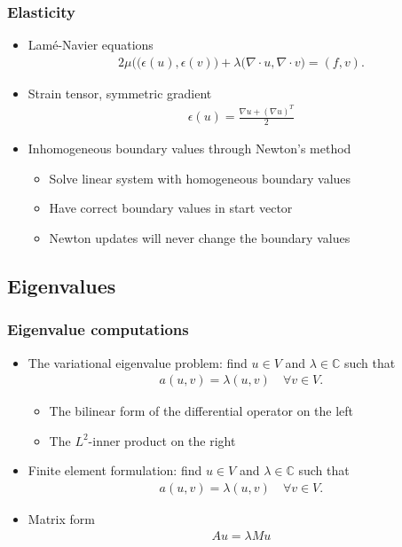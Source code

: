 \begin{frame}
  \frametitle{Elasticity}
  \begin{itemize}
  \item Lamé-Navier equations
    \begin{gather*}
      2\mu \bigl((\epsilon(u), \epsilon(v)\bigr)
      + \lambda \bigl(\nabla\!\cdot\!u,\nabla\!\cdot\!v\bigr)
      = (f,v).
    \end{gather*}
  \item Strain tensor, symmetric gradient
    \begin{gather*}
      \epsilon(u) = \frac{\nabla u + (\nabla u)^T}{2}
    \end{gather*}
  \item Inhomogeneous boundary values through Newton's method
    \begin{itemize}
    \item Solve linear system with homogeneous boundary values
    \item Have correct boundary values in start vector
    \item Newton updates will never change the boundary values
    \end{itemize}
  \end{itemize}
\end{frame}

\subsection{Eigenvalues}
\frame{\tableofcontents[currentsection,subsectionstyle=show/shaded/hide]}

\begin{frame}
  \frametitle{Eigenvalue computations}
  \begin{itemize}
  \item The variational eigenvalue problem: find $u\in V$ and $\lambda\in\mathbb C$ such that
    \begin{gather*}
      a(u,v) = \lambda (u,v)\quad\forall v\in V.
    \end{gather*}
    \begin{itemize}
    \item The bilinear form of the differential operator on the left
    \item The $L^2$-inner product on the right
    \end{itemize}
    \item Finite element formulation: find $u\in V$ and $\lambda\in\mathbb C$ such that
    \begin{gather*}
      a(u,v) = \lambda (u,v)\quad\forall v\in V.
    \end{gather*}
  \item Matrix form
    \begin{gather*}
      A u = \lambda M u
    \end{gather*}
  \end{itemize}
\end{frame}

